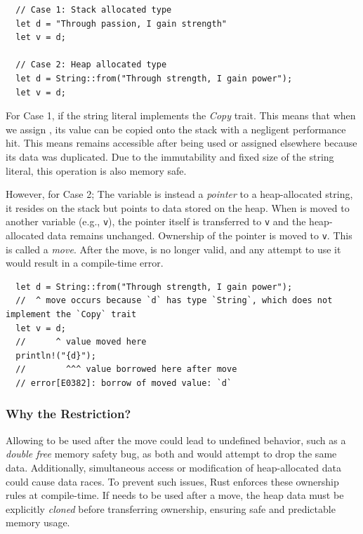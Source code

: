 \documentclass[11pt]{report}
\theoremstyle{definition}
\theoremstyle{plain}
\begin{document}
\begin{verbatim}
  // Case 1: Stack allocated type
  let d = "Through passion, I gain strength"
  let v = d;

  // Case 2: Heap allocated type
  let d = String::from("Through strength, I gain power");
  let v = d;
\end{verbatim}

For Case 1, if the string literal  implements the \textit{Copy} trait. This means that when we assign , its value can be copied onto the stack with a negligent performance hit. This means  remains accessible after being used or assigned elsewhere because its data was duplicated. Due to the immutability and fixed size of the string literal, this operation is also memory safe.

However, for Case 2; The variable  is instead a \textit{pointer} to a heap-allocated string, it resides on the stack but points to data stored on the heap. When  is moved to another variable (e.g., \texttt{v}), the pointer itself is transferred to \texttt{v} and the heap-allocated data remains unchanged. Ownership of the pointer is moved to \texttt{v}. This is called a \textit{move}. After the move,  is no longer valid, and any attempt to use it would result in a compile-time error.
\begin{verbatim}
  let d = String::from("Through strength, I gain power");
  //  ^ move occurs because `d` has type `String`, which does not implement the `Copy` trait
  let v = d;
  //      ^ value moved here
  println!("{d}"); 
  //        ^^^ value borrowed here after move
  // error[E0382]: borrow of moved value: `d`
\end{verbatim}

\subsubsection{Why the Restriction?}

Allowing  to be used after the move could lead to undefined behavior, such as a \textit{double free} memory safety bug, as both  and  would attempt to drop the same data. Additionally, simultaneous access or modification of heap-allocated data could cause data races. To prevent such issues, Rust enforces these ownership rules at compile-time. If  needs to be used after a move, the heap data must be explicitly \textit{cloned} before transferring ownership, ensuring safe and predictable memory usage.
\end{document}
